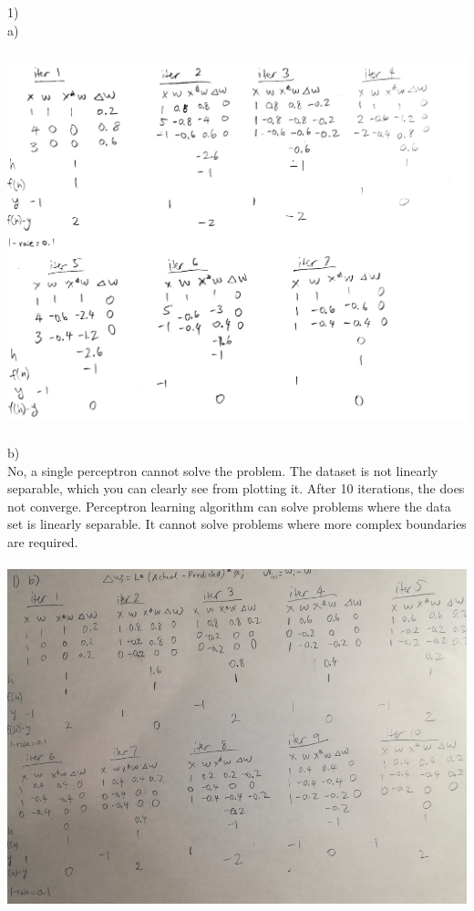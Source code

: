 \documentclass[11pt]{article}
\begin{document}
1) \\
a)
\\
\\
\includegraphics[scale=0.15]{hand1}
\\
\\
b) \\
No, a single perceptron cannot solve the problem. The dataset is not linearly separable, which you can clearly see from plotting it. After 10 iterations, the does not converge. Perceptron learning algorithm can solve problems where the data set is linearly separable. It cannot solve problems where more complex boundaries are required. \\
\\
\includegraphics[scale=0.35]{perceptronhand}
\\
\end{document}
